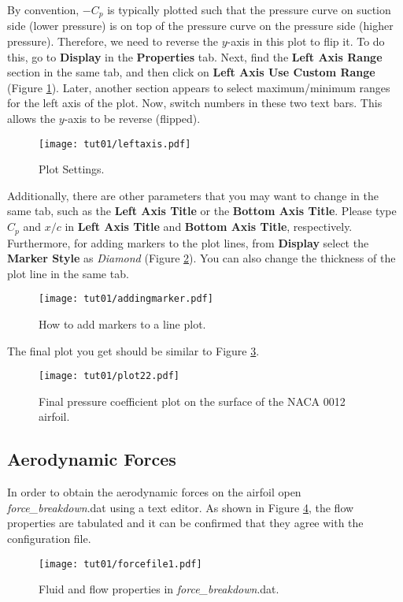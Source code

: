 By convention, $-C_p$ is typically plotted such that the pressure curve on suction side (lower pressure) is on top of the pressure curve on the pressure side (higher pressure). Therefore, we need to reverse the $y$-axis in this plot to flip it. To do this, go to \textbf{Display} in the \textbf{Properties} tab. Next, find the \textbf{Left Axis Range} section in the same tab, and then click on \textbf{Left Axis Use Custom Range} (Figure \ref{fig1:viewsetting}). Later, another section appears to select maximum/minimum ranges for the left axis of the plot. Now, switch numbers in these two text bars. This allows the $y$-axis to be reverse (flipped).
\begin{figure}[htbp]
    \centering
    \texttt{[image: tut01/leftaxis.pdf]}
    \caption{Plot Settings.}
    \label{fig1:viewsetting}
\end{figure}
Additionally, there are other parameters that you may want to change in the same tab, such as the \textbf{Left Axis Title} or the \textbf{Bottom Axis Title}. Please type $C_p$ and $x/c$ in \textbf{Left Axis Title} and \textbf{Bottom Axis Title}, respectively. Furthermore, for adding markers to the plot lines, from \textbf{Display} select the \textbf{Marker Style} as \textit{Diamond} (Figure \ref{fig1:marker}). You can also change the thickness of the plot line in the same tab.
\begin{figure}[htbp]
    \centering
    \texttt{[image: tut01/addingmarker.pdf]}
    \caption{How to add markers to a line plot.}
    \label{fig1:marker}
\end{figure}
The final plot you get should be similar to Figure \ref{fig1:surface_pressure2}.
\begin{figure}[htbp]
    \centering
    \texttt{[image: tut01/plot22.pdf]}
    \caption{Final pressure coefficient plot on the surface of the NACA 0012 airfoil.}
    \label{fig1:surface_pressure2}
\end{figure}
\subsection{Aerodynamic Forces}
In order to obtain the aerodynamic forces on the airfoil open \textit{force\_breakdown}.dat using a text editor. As shown in Figure \ref{fig1:forcefile1}, the flow properties are tabulated and it can be confirmed that they agree with the configuration file. 
\begin{figure}[htbp]
    \centering
    \texttt{[image: tut01/forcefile1.pdf]}
    \caption{Fluid and flow properties in \textit{force\_breakdown}.dat.}
    \label{fig1:forcefile1}
\end{figure}

